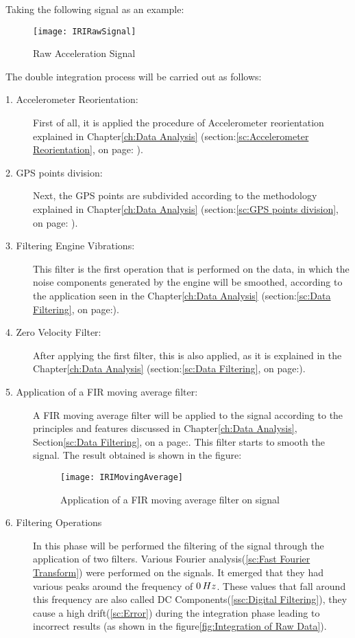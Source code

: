 \documentclass[tesi]{subfiles}
\begin{document}
Taking the following signal as an example:


\begin{figure}[H]
\centering
\texttt{[image: IRIRawSignal]}
\caption{Raw Acceleration Signal}
\end{figure}
The double integration process will be carried out as follows:



\begin{description}
\item[1. Accelerometer Reorientation:] First of all, it is applied the procedure of Accelerometer reorientation explained in Chapter\ref{ch:Data Analysis} (section:\ref{sc:Accelerometer Reorientation}, on page: \pageref{sc:Accelerometer Reorientation}).
\item[2. GPS points division:] Next, the GPS points are subdivided according to the methodology explained in Chapter\ref{ch:Data Analysis} (section:\ref{sc:GPS points division}, on page: \pageref{sc:GPS points division}).
\item[3. Filtering Engine Vibrations:] This filter is the first operation that is performed on the data, in which the noise components generated by the engine will be smoothed, according to the application seen in the Chapter\ref{ch:Data Analysis} (section:\ref{sc:Data Filtering}, on page:\pageref{sssc:Remove Engine Vibrations Filter}).
\item[4. Zero Velocity Filter:] After applying the first filter, this is also applied, as it is explained in the Chapter\ref{ch:Data Analysis} (section:\ref{sc:Data Filtering}, on page:\pageref{sssc:Zero Velocity Filter}).
\item[5. Application of a FIR moving average filter:] A FIR moving average filter will be applied to the signal according to the principles and features discussed in Chapter\ref{ch:Data Analysis}, Section\ref{sc:Data Filtering}, on a page:\pageref{p:moving_average}.
This filter starts to smooth the signal.
The result obtained is shown in the figure:
\begin{figure}[H]
\centering
\texttt{[image: IRIMovingAverage]}
\caption{Application of a FIR moving average filter on signal}
\end{figure}
\clearpage
\item[6. Filtering Operations]
In this phase will be performed the filtering of the signal through the application of two filters.
Various Fourier analysis(\ref{sc:Fast Fourier Transform}) were performed on the signals.
It emerged that they had various peaks around the frequency of $0 \thinspace Hz$. These values that fall around this frequency are also called DC Components(\ref{ssc:Digital Filtering}), they cause a high drift(\ref{sc:Error}) during the integration phase leading to incorrect results (as shown in the figure\ref{fig:Integration of Raw Data}).

\end{description}
\end{document}
